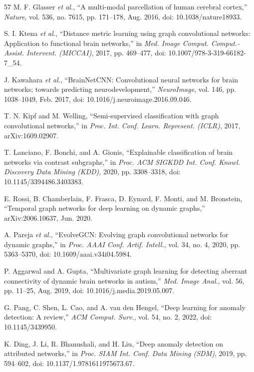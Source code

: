 \begin{thebibliography}{57}
M. F. Glasser \emph{et al.}, ``A multi-modal parcellation of human cerebral cortex,'' \emph{Nature}, vol. 536, no. 7615, pp. 171--178, Aug. 2016, doi: 10.1038/nature18933.

S. I. Ktena \emph{et al.}, ``Distance metric learning using graph convolutional networks: Application to functional brain networks,'' in \emph{Med. Image Comput. Comput.-Assist. Intervent. (MICCAI)}, 2017, pp. 469--477, doi: 10.1007/978-3-319-66182-7\_54.

J. Kawahara \emph{et al.}, ``BrainNetCNN: Convolutional neural networks for brain networks; towards predicting neurodevelopment,'' \emph{NeuroImage}, vol. 146, pp. 1038--1049, Feb. 2017, doi: 10.1016/j.neuroimage.2016.09.046.

T. N. Kipf and M. Welling, ``Semi-supervised classification with graph convolutional networks,'' in \emph{Proc. Int. Conf. Learn. Represent. (ICLR)}, 2017, arXiv:1609.02907.

T. Lanciano, F. Bonchi, and A. Gionis, ``Explainable classification of brain networks via contrast subgraphs,'' in \emph{Proc. ACM SIGKDD Int. Conf. Knowl. Discovery Data Mining (KDD)}, 2020, pp. 3308--3318, doi: 10.1145/3394486.3403383.

E. Rossi, B. Chamberlain, F. Frasca, D. Eynard, F. Monti, and M. Bronstein, ``Temporal graph networks for deep learning on dynamic graphs,'' arXiv:2006.10637, Jun. 2020.

A. Pareja \emph{et al.}, ``EvolveGCN: Evolving graph convolutional networks for dynamic graphs,'' in \emph{Proc. AAAI Conf. Artif. Intell.}, vol. 34, no. 4, 2020, pp. 5363--5370, doi: 10.1609/aaai.v34i04.5984.

P. Aggarwal and A. Gupta, ``Multivariate graph learning for detecting aberrant connectivity of dynamic brain networks in autism,'' \emph{Med. Image Anal.}, vol. 56, pp. 11--25, Aug. 2019, doi: 10.1016/j.media.2019.05.007.

G. Pang, C. Shen, L. Cao, and A. van den Hengel, ``Deep learning for anomaly detection: A review,'' \emph{ACM Comput. Surv.}, vol. 54, no. 2, 2022, doi: 10.1145/3439950.

K. Ding, J. Li, R. Bhanushali, and H. Liu, ``Deep anomaly detection on attributed networks,'' in \emph{Proc. SIAM Int. Conf. Data Mining (SDM)}, 2019, pp. 594--602, doi: 10.1137/1.9781611975673.67.


\end{thebibliography}
